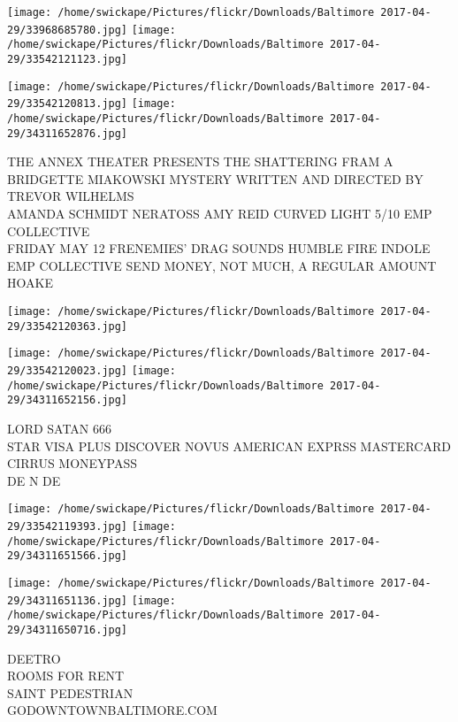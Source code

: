 \documentclass[10pt,letterpaper]{article}
\begin{document}
\texttt{[image: /home/swickape/Pictures/flickr/Downloads/Baltimore 2017-04-29/33968685780.jpg]}
\texttt{[image: /home/swickape/Pictures/flickr/Downloads/Baltimore 2017-04-29/33542121123.jpg]}

\texttt{[image: /home/swickape/Pictures/flickr/Downloads/Baltimore 2017-04-29/33542120813.jpg]}
\texttt{[image: /home/swickape/Pictures/flickr/Downloads/Baltimore 2017-04-29/34311652876.jpg]}

THE ANNEX THEATER PRESENTS THE SHATTERING FRAM A BRIDGETTE MIAKOWSKI MYSTERY WRITTEN AND DIRECTED BY TREVOR WILHELMS\\
AMANDA SCHMIDT NERATOSS AMY REID CURVED LIGHT 5/10 EMP COLLECTIVE\\
FRIDAY MAY 12 FRENEMIES' DRAG SOUNDS HUMBLE FIRE INDOLE EMP COLLECTIVE SEND MONEY, NOT MUCH, A REGULAR AMOUNT\\
HOAKE\\
\pagebreak

\texttt{[image: /home/swickape/Pictures/flickr/Downloads/Baltimore 2017-04-29/33542120363.jpg]}

\vspace{0.25in}
\texttt{[image: /home/swickape/Pictures/flickr/Downloads/Baltimore 2017-04-29/33542120023.jpg]}
\texttt{[image: /home/swickape/Pictures/flickr/Downloads/Baltimore 2017-04-29/34311652156.jpg]}

LORD SATAN 666\\
STAR VISA PLUS DISCOVER NOVUS AMERICAN EXPRSS MASTERCARD CIRRUS MONEYPASS\\
DE N DE\\
\pagebreak

\texttt{[image: /home/swickape/Pictures/flickr/Downloads/Baltimore 2017-04-29/33542119393.jpg]}
\texttt{[image: /home/swickape/Pictures/flickr/Downloads/Baltimore 2017-04-29/34311651566.jpg]}

\texttt{[image: /home/swickape/Pictures/flickr/Downloads/Baltimore 2017-04-29/34311651136.jpg]}
\texttt{[image: /home/swickape/Pictures/flickr/Downloads/Baltimore 2017-04-29/34311650716.jpg]}

DEETRO\\
ROOMS FOR RENT\\
SAINT PEDESTRIAN\\
GODOWNTOWNBALTIMORE.COM\\
\pagebreak
\end{document}
